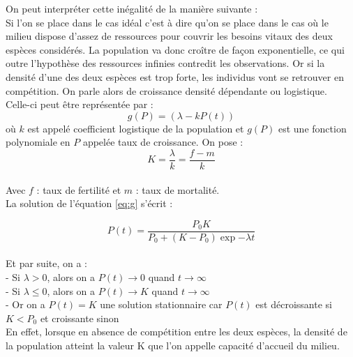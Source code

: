 \documentclass{article}
\begin{document}
\vspace{1cm}
On peut interpréter cette inégalité de la manière suivante :\\

Si l'on se place dans le cas idéal c'est à dire qu'on se place dans le cas où le milieu dispose d'assez de ressources pour couvrir les besoins vitaux des deux espèces considérés. La population va donc croître de façon exponentielle, ce qui outre l'hypothèse des ressources infinies contredit les observations. Or si la densité d'une des deux espèces est trop forte, les individus vont se retrouver en compétition. On parle alors de croissance densité dépendante ou logistique.\\

\vspace{0.5cm}
Celle-ci peut être représentée par :
\begin{equation}
\label{eq:g}
\tag{G}
    g(P) = (\lambda-kP(t))
\end{equation}
où $k$ est appelé coefficient logistique de la population et $g(P)$ est une fonction polynomiale en $P$ appelée taux de croissance.
On pose : 
\begin{equation*}
    K = \frac{\lambda}{k}= \frac{f-m}{k}
\end{equation*}\\

Avec $f$ : taux de fertilité et $m$ : taux de mortalité.\\

La solution de l'équation \eqref{eq:g} s'écrit :

\begin{equation*}
    P(t) = \frac{P_{0}K}{P_{0}+(K-P_{0})\exp{-\lambda}t}
\end{equation*}\\

Et par suite, on a :\\

\noindent
- Si $\lambda > 0$, alors on a $P(t) \longrightarrow 0$ quand $t \longrightarrow \infty$\\

\noindent
- Si $\lambda \leqslant 0$, alors on a $P(t) \longrightarrow K$ quand $t \longrightarrow \infty$\\


\noindent
- Or on a $P(t) = K$ une solution stationnaire car $P(t)$ est décroissante si $K < P_0$ et croissante sinon\\

En effet, lorsque en absence de compétition entre les deux espèces, la densité de la population atteint la valeur K que l'on appelle capacité d'accueil du milieu.\\
\end{document}
